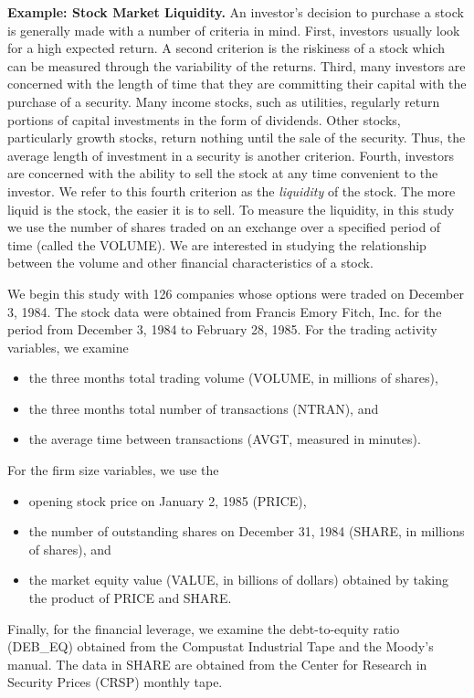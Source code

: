 \textbf{Example: Stock Market Liquidity.} An investor's decision to purchase a stock is generally
made with a number of criteria in mind. First, investors usually
look for a high expected return. A second criterion is the riskiness
of a stock which can be measured through the variability of the
returns. Third, many investors are concerned with the length of time
that they are committing their capital with the purchase of a
security. Many income stocks, such as utilities, regularly return
portions of capital investments in the form of dividends. Other
stocks, particularly growth stocks, return nothing until the sale of
the security. Thus, the average length of investment in a security
is another criterion. Fourth, investors are concerned with the
ability to sell the stock at any time convenient to the investor. We
refer to this fourth criterion as the \textit{liquidity }of the
stock. The more liquid is the stock, the easier it is to sell. To
measure the liquidity, in this study we use the number of shares
traded on an exchange over a specified period of time (called the
VOLUME). We are interested in studying the relationship between the
volume and other financial characteristics of a stock.

We begin this study with 126 companies whose options were traded on December
3, 1984. The stock data were obtained from Francis Emory Fitch, Inc. for the
period from December 3, 1984 to February 28, 1985. For the trading activity
variables, we examine
\begin{itemize}
\item the three months total trading volume (VOLUME, in millions of shares),
\item the three months total number of transactions (NTRAN), and
\item the average time between transactions (AVGT, measured in minutes).
\end{itemize}
\noindent For the firm size variables, we use the
\begin{itemize}
\item opening stock price on January 2, 1985 (PRICE),
\item  the number of outstanding shares on December 31, 1984 (SHARE, in millions of shares), and
\item  the market equity value (VALUE, in billions of dollars) obtained by taking the product of PRICE and SHARE.
\end{itemize}
\noindent Finally, for the financial leverage, we examine the
debt-to-equity ratio (DEB\_EQ) obtained from the Compustat
Industrial Tape and the Moody's manual. The data in SHARE are
obtained from the Center for Research in Security Prices (CRSP)
monthly tape.

